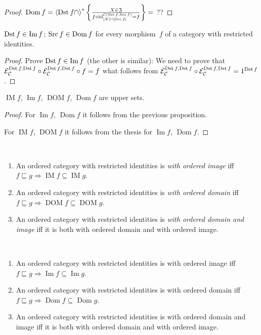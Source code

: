\begin{proof}
$\operatorname{Dom}f =
\left\langle \operatorname{Dst} f\cap\right\rangle ^{\ast}
\left\{ \frac{X \in \mathfrak{Z}}{f \circ \operatorname{id}^{\mathcal{C}(\operatorname{Src} f,\operatorname{Src} f)}_{[X]\sqcap[\operatorname{Src} f]} = f}\right\}=$
??
\end{proof}

\begin{prop}\label{dst-in-im}
$\operatorname{Dst} f\in\operatorname{Im} f$; $\operatorname{Src} f\in\operatorname{Dom} f$ for every morphism~$f$ of a category with restricted
identities.
\end{prop}

\begin{proof}
Prove $\operatorname{Dst} f\in\operatorname{Im} f$ (the other is similar):
We need to prove that $\mathcal{E}_{\mathcal{C}}^{\operatorname{Dst} f, \operatorname{Dst} f} \circ \mathcal{E}_{\mathcal{C}}^{\operatorname{Dst} f,
\operatorname{Dst} f} \circ f = f$ what follows from
$\mathcal{E}_{\mathcal{C}}^{\operatorname{Dst} f, \operatorname{Dst} f} \circ \mathcal{E}_{\mathcal{C}}^{\operatorname{Dst} f, \operatorname{Dst} f} = 1^{\operatorname{Dst} f}$.
\end{proof}

\begin{prop}
$\operatorname{IM}f$, $\operatorname{Im}f$,
$\operatorname{DOM}f$, $\operatorname{Dom}f$
are upper sets.
\end{prop}

\begin{proof}
For $\operatorname{Im}f$, $\operatorname{Dom}f$ it follows
from the previous proposition.

For $\operatorname{IM}f$, $\operatorname{DOM}f$ it follows
from the thesis for
$\operatorname{Im}f$, $\operatorname{Dom}f$.
\end{proof}

\begin{defn}
~
\begin{enumerate}
\item An ordered category with restricted identities is
\emph{with ordered image} iff $f\sqsubseteq g\Rightarrow
\operatorname{IM}f\subseteq\operatorname{IM}g$.
\item An ordered category with restricted identities is
\emph{with ordered domain} iff $f\sqsubseteq g\Rightarrow
\operatorname{DOM}f\subseteq\operatorname{DOM}g$.
\item An ordered category with restricted identities is
\emph{with ordered domain and image} iff it is both
with ordered domain and with ordered image.
\end{enumerate}
\end{defn}

\begin{obvious}
~
\begin{enumerate}
\item An ordered category with restricted identities is
with ordered image iff $f\sqsubseteq g\Rightarrow
\operatorname{Im}f\subseteq\operatorname{Im}g$.
\item An ordered category with restricted identities is
with ordered domain iff $f\sqsubseteq g\Rightarrow
\operatorname{Dom}f\subseteq\operatorname{Dom}g$.
\item An ordered category with restricted identities is
with ordered domain and image iff it is both
with ordered domain and with ordered image.
\end{enumerate}
\end{obvious}

